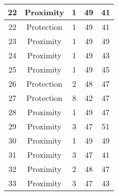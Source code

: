 \documentclass[results.tex]{subfiles}
\begin{document}
\begin{center}
\begin{tabular}{| c || c | c | c | c |}
            \hline
            22                      & Proximity                    & 1                      & 49                      & 41                   \\
            \hline
            22                      & Protection                   & 1                      & 49                      & 41                   \\
            \hline
            23                      & Proximity                    & 1                      & 49                      & 49                   \\
            \hline
            24                      & Proximity                    & 1                      & 49                      & 43                   \\
            \hline
            25                      & Proximity                    & 1                      & 49                      & 45                   \\
            \hline
            26                      & Protection                   & 2                      & 48                      & 47                   \\
            \hline
            27                      & Protection                   & 8                      & 42                      & 47                   \\
            \hline
            28                      & Proximity                    & 1                      & 49                      & 47                   \\
            \hline
            29                      & Proximity                    & 3                      & 47                      & 51                   \\
            \hline
            30                      & Proximity                    & 1                      & 49                      & 49                   \\
            \hline
            31                      & Proximity                    & 3                      & 47                      & 41                   \\
            \hline
            32                      & Proximity                    & 2                      & 48                      & 47                   \\
            \hline
            33                      & Proximity                    & 3                      & 47                      & 43                   \\

\end{tabular}
\end{center}
\end{document}
